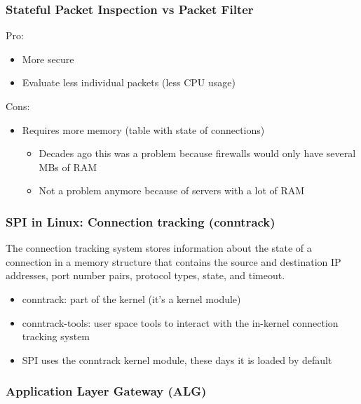 \documentclass{article}
\begin{document}
\subsubsection{Stateful Packet Inspection vs Packet Filter}

Pro:

\begin{itemize}
    \item More secure
    \item Evaluate less individual packets (less CPU usage)
\end{itemize}

Cons:

\begin{itemize}
    \item Requires more memory (table with state of connections)
    \begin{itemize}
        \item Decades ago this was a problem because firewalls would only have several MBs of RAM
        \item Not a problem anymore because of servers with a lot of RAM
    \end{itemize}
\end{itemize}

\subsubsection{SPI in Linux: Connection tracking (conntrack)}

The connection tracking system stores information 
about the state of a connection in a memory structure that 
contains the source and destination IP addresses, port number pairs, 
protocol types, state, and timeout.

\begin{itemize}
    \item conntrack: part of the kernel (it's a kernel module)
    \item conntrack-tools: user space tools to interact with the in-kernel connection tracking system
    \item SPI uses the conntrack kernel module, these days it is loaded by default
\end{itemize}

\subsubsection{Application Layer Gateway (ALG)}
\end{document}
